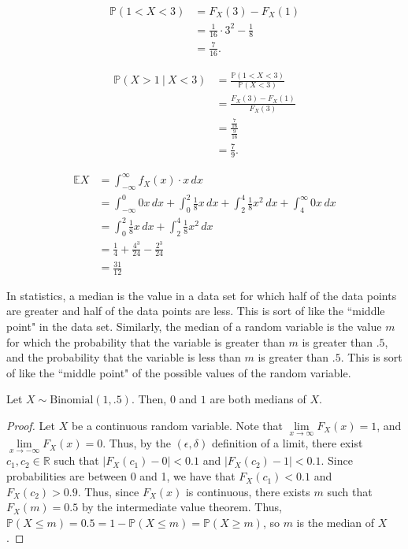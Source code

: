 \documentclass[12pt]{article}
\begin{document}
\medskip
{}
\begin{align*}
    \mathbb P(1 < X < 3) &= F_X(3) - F_X(1) \\
                         &= \frac1{16} \cdot 3^2 - \frac18 \\
                         &= \frac7{16}.
\end{align*}

\medskip
{}
\begin{align*}
    \mathbb P(X > 1~|~X<3) &= \frac{\mathbb P(1 < X < 3)}{\mathbb P(X < 3)} \\
                           &= \frac{F_X(3) - F_X(1)}{F_X(3)} \\
                           &= \frac{\frac7{16}}{\frac9{16}} \\
                           &= \frac79.
\end{align*}

\newpage
{}
\begin{align*}
    \mathbb EX &= \int_{-\infty}^\infty f_X(x) \cdot x\,dx \\
               &= \int_{-\infty}^0 0x\,dx + \int_0^2 \frac18x\,dx + \int_2^4 \frac18x^2\,dx + \int_4^\infty 0x\,dx \\
               &= \int_0^2 \frac18x\,dx + \int_2^4 \frac18x^2\,dx \\
               &= \frac14 + \frac{4^3}{24} - \frac{2^3}{24} \\
               &= \frac{31}{12}
\end{align*}

\newpage
{}

 In statistics, a median is the value in a data set for which half of the data points are greater and half of the data points are less. This is sort of like the ``middle point" in the data set. Similarly, the median of a random variable is the value $m$ for which the probability that the variable is greater than $m$ is greater than $.5$, and the probability that the variable is less than $m$ is greater than $.5$. This is sort of like the ``middle point" of the possible values of the random variable.

\medskip
{} Let $X\sim\text{Binomial}(1, .5)$. Then, $0$ and $1$ are both medians of $X$.

\medskip
{}
\begin{proof}
    Let $X$ be a continuous random variable. Note that $\lim\limits_{x\to\infty} F_X(x) = 1$, and $\lim\limits_{x\to-\infty} F_X(x) = 0$. Thus, by the $(\epsilon, \delta)$ definition of a limit, there exist $c_1, c_2 \in \mathbb R$ such that $|F_X(c_1) - 0| < 0.1$ and $|F_X(c_2) - 1| < 0.1$. Since probabilities are between 0 and 1, we have that $F_X(c_1) < 0.1$ and $F_X(c_2) > 0.9$. Thus, since $F_X(x)$ is continuous, there exists $m$ such that $F_X(m) = 0.5$ by the intermediate value theorem. Thus, $\mathbb P(X \leq m) = 0.5 = 1 - \mathbb P(X \leq m) = \mathbb P(X \geq m)$, so $m$ is the median of $X$.
\end{proof}
\end{document}
